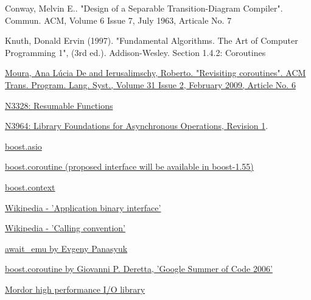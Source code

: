 \begin{thebibliography}{99}

        {Conway, Melvin E.. "Design of a Separable Transition-Diagram Compiler".
         Commun. ACM, Volume 6 Issue 7, July 1963, Articale No. 7}

        {Knuth, Donald Ervin (1997). "Fundamental Algorithms. The Art of Computer Programming 1", (3rd ed.).
         Addison-Wesley. Section 1.4.2: Coroutines}

        \href{http://www.inf.puc-rio.br/~roberto/docs/MCC15-04.pdf}
        {Moura, Ana L\'{u}cia De and Ierusalimschy, Roberto. "Revisiting coroutines".
         ACM Trans. Program. Lang. Syst., Volume 31 Issue 2, February 2009, Article No. 6}

        \href{http://www.open-std.org/jtc1/sc22/wg21/docs/papers/2012/n3328.pdf}
        {N3328: Resumable Functions}

        \href{http://www.open-std.org/jtc1/sc22/wg21/docs/papers/2014/n3964.pdf}
        {N3964: Library Foundations for Asynchronous Operations, Revision 1}.

        \href{http://www.boost.org/doc/libs/1_54_0/doc/html/boost_asio.html}
        {boost.asio}

        \href{http://www.boost.org}
        {boost.coroutine (proposed interface will be available in boost-1.55)}

        \href{http://www.boost.org}
        {boost.context}

        \href{http://en.wikipedia.org/wiki/Application_binary_interface}
        {Wikipedia - 'Application binary interface'}

        \href{http://en.wikipedia.org/wiki/Calling_convention}
        {Wikipedia - 'Calling convention'}

        \href{http://github.com/panaseleus/await_emu}
        {await\_emu by Evgeny Panasyuk}

        \href{http://www.crystalclearsoftware.com/soc/coroutine/}
        {boost.coroutine by Giovanni P. Deretta, 'Google Summer of Code 2006'}

        \href{http://code.mozy.com/projects/mordor}
        {Mordor high performance I/O library}


\end{thebibliography}
